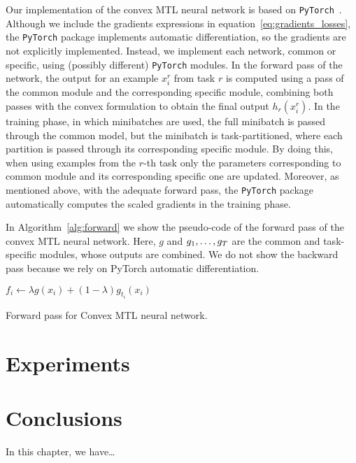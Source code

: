 Our implementation of the convex MTL neural network is based on \texttt{PyTorch}~\citep{PyTorch}.
Although we include the gradients expressions in equation~\eqref{eq:gradients_losses}, the \texttt{PyTorch} package implements automatic differentiation, so the gradients are not explicitly implemented.
Instead, we implement each network, common or specific, using (possibly different) \texttt{PyTorch} modules.
In the forward pass of the network, the output for an example $x_i^r$ from task $r$ is computed using a pass of the common module and the corresponding specific module, combining both passes with the convex formulation to obtain the final output $h_r(x_i^r)$.
In the training phase, in which minibatches are used, the full minibatch is passed through the common model, but the minibatch is task-partitioned, where each partition is passed through its corresponding specific module.
By doing this, when using examples from the $r$-th task only the parameters corresponding to common module and its corresponding specific one are updated.
Moreover, as mentioned above, with the adequate forward pass, the \texttt{PyTorch} package automatically computes the scaled gradients in the training phase.

{In Algorithm~\ref{alg:forward} we show the pseudo-code of the forward pass of the convex MTL neural network. Here, $g$ and $g_1, \ldots, g_T$ are the common and task-specific modules, whose outputs are combined. We do not show the backward pass because we rely on PyTorch automatic differentiation.}

\begin{algorithm}[!t]
    \DontPrintSemicolon
      
            { 
                $f_i \gets \lambda g(x_i) + (1 - \lambda) g_{t_i}(x_i)$   

            }
    \caption{Forward pass for Convex MTL neural network.}
    \label{alg:forward}
\end{algorithm}


\section{Experiments}

\section{Conclusions}\label{sec-conclusions-3}

In this chapter, we have\dots
